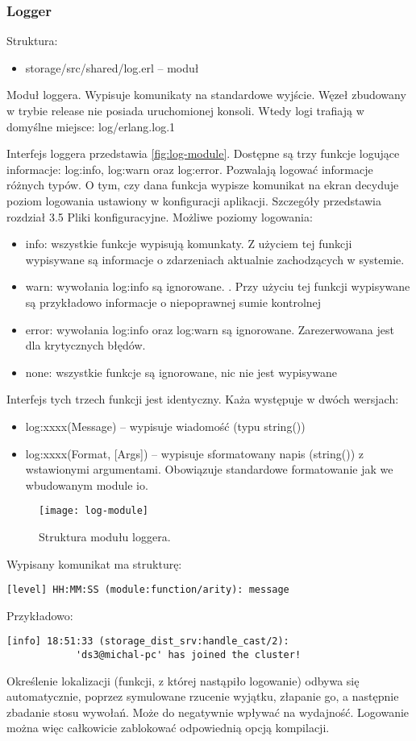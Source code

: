 \subsubsection{Logger}
Struktura:
\begin{itemize}
	\item storage/src/shared/log.erl – moduł
\end{itemize}

Moduł loggera. Wypisuje komunikaty na standardowe wyjście. Węzeł zbudowany w trybie release nie posiada uruchomionej konsoli. Wtedy logi trafiają w domyślne miejsce: log/erlang.log.1

Interfejs loggera przedstawia \autoref{fig:log-module}. Dostępne są trzy funkcje logujące informacje: log:info, log:warn oraz log:error. Pozwalają logować informacje różnych typów. O tym, czy dana funkcja wypisze komunikat na ekran decyduje poziom logowania ustawiony w konfiguracji aplikacji. Szczegóły przedstawia rozdział 3.5 Pliki konfiguracyjne. Możliwe poziomy logowania:
\begin{itemize}
	\item info: wszystkie funkcje wypisują komunkaty. Z użyciem tej funkcji wypisywane są informacje o zdarzeniach aktualnie zachodzących w systemie.
	\item warn: wywołania log:info są ignorowane. . Przy użyciu tej funkcji wypisywane są przykładowo informacje o niepoprawnej sumie kontrolnej
	\item error: wywołania log:info oraz log:warn są ignorowane. Zarezerwowana jest dla krytycznych błędów.
	\item none: wszystkie funkcje są ignorowane, nic nie jest wypisywane
\end{itemize}

Interfejs tych trzech funkcji jest identyczny. Każa występuje w dwóch wersjach:
\begin{itemize}
	\item log:xxxx(Message) – wypisuje wiadomość (typu string())
	\item log:xxxx(Format, [Args]) – wypisuje sformatowany napis (string()) z wstawionymi argumentami. Obowiązuje standardowe formatowanie jak we wbudowanym module io.
\end{itemize}

\begin{figure}[!htbp]
	\centering
	\texttt{[image: log-module]}
	\caption{Struktura modułu loggera.}
	\label{fig:log-module}
\end{figure}

Wypisany komunikat ma strukturę:

\centerline{\texttt{[level] HH:MM:SS (module:function/arity): message}}

Przykładowo:
\begin{lstlisting}
[info] 18:51:33 (storage_dist_srv:handle_cast/2):
			'ds3@michal-pc' has joined the cluster!
\end{lstlisting}

Określenie lokalizacji (funkcji, z której nastąpiło logowanie) odbywa się automatycznie, poprzez symulowane rzucenie wyjątku, złapanie go, a następnie zbadanie stosu wywołań. Może do negatywnie wpływać na wydajność. Logowanie można więc całkowicie zablokować odpowiednią opcją kompilacji.
